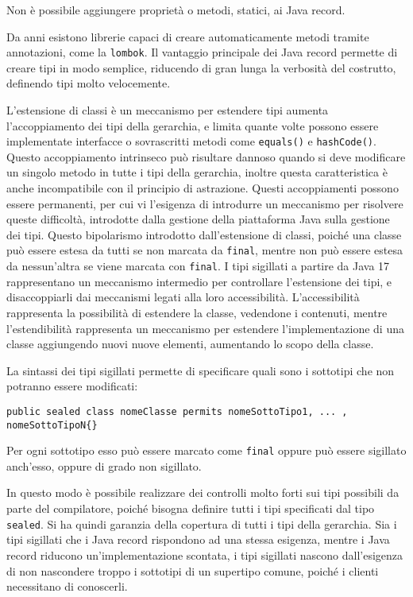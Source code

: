 \documentclass{article}
\numberwithin{equation}{subsection}
\begin{document}
Non è possibile aggiungere proprietà o metodi, statici, ai Java record. 

Da anni esistono librerie capaci di creare automaticamente metodi tramite annotazioni, come la \verb|lombok|. Il vantaggio principale dei Java record permette di 
creare tipi in modo semplice, riducendo di gran lunga la verbosità del costrutto, definendo tipi molto velocemente.

L'estensione di classi è un meccanismo per estendere tipi aumenta l'accoppiamento dei tipi della gerarchia, e limita quante volte possono essere implementate interfacce o 
sovrascritti metodi come \verb|equals()| e \verb|hashCode()|. Questo accoppiamento intrinseco può risultare dannoso quando si deve modificare un singolo metodo in tutte i 
tipi della gerarchia, inoltre questa caratteristica è anche incompatibile con il principio di astrazione. 
Questi accoppiamenti possono essere permanenti, per cui vi l'esigenza di introdurre un meccanismo per risolvere queste difficoltà, introdotte dalla gestione della 
piattaforma Java sulla gestione dei tipi. 
Questo bipolarismo introdotto dall'estensione di classi, poiché una classe può essere estesa da tutti se non marcata da \verb|final|, mentre non può essere estesa da nessun'altra 
se viene marcata con \verb|final|. I tipi sigillati a partire da Java 17 rappresentano un meccanismo intermedio per controllare l'estensione dei tipi, e disaccoppiarli dai 
meccanismi legati alla loro accessibilità. 
L'accessibilità rappresenta la possibilità di estendere la classe, vedendone i contenuti, mentre l'estendibilità rappresenta un meccanismo per estendere l'implementazione di 
una classe aggiungendo nuovi nuove elementi, aumentando lo scopo della classe. 

La sintassi dei tipi sigillati permette di specificare quali sono i sottotipi che non potranno essere modificati:
\begin{verbatim}
public sealed class nomeClasse permits nomeSottoTipo1, ... , nomeSottoTipoN{}
\end{verbatim}
Per ogni sottotipo esso può essere marcato come \verb|final| oppure può essere sigillato anch'esso, oppure di grado non sigillato. 


In questo modo è possibile realizzare dei controlli molto forti sui tipi possibili da parte del compilatore, poiché bisogna definire tutti i tipi specificati dal tipo \verb|sealed|. 
Si ha quindi garanzia della copertura di tutti i tipi della gerarchia. 
Sia i tipi sigillati che i Java record rispondono ad una stessa esigenza, mentre i Java record riducono un'implementazione scontata, i tipi sigillati nascono dall'esigenza 
di non nascondere troppo i sottotipi di un supertipo comune, poiché i clienti necessitano di conoscerli. 
\end{document}
